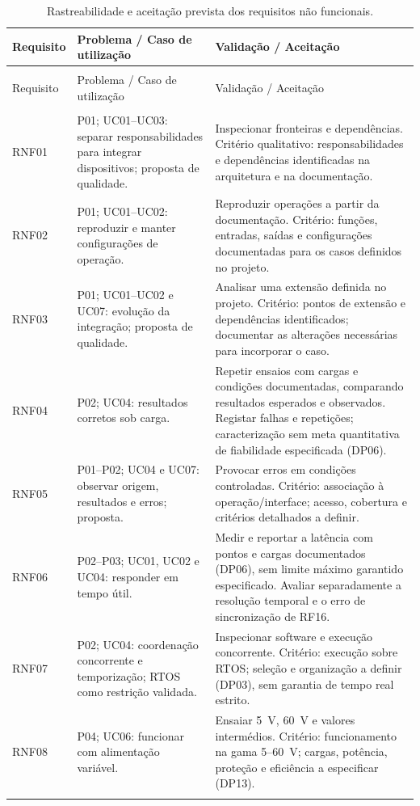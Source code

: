 \begingroup
\small
{}
\setlength{\tabcolsep}{4pt}
\renewcommand{\arraystretch}{1.12}
\begin{longtable}{@{}>{\raggedright\arraybackslash}p{}>{\raggedright\arraybackslash}p{}>{\raggedright\arraybackslash}p{}@{}}
\caption{Rastreabilidade e aceitação prevista dos requisitos não funcionais.}\label{tab:rastreabilidade-rnf}\\
\toprule
\rowcolor{LasetTint}
Requisito & Problema / Caso de utilização & Validação / Aceitação \\
\midrule
\endfirsthead
\multicolumn{3}{c}{\tablename~\thetable{} (continuação)}\\
\toprule
\rowcolor{LasetTint}
Requisito & Problema / Caso de utilização & Validação / Aceitação \\
\midrule
\endhead
\midrule
\multicolumn{3}{r}{Continua na página seguinte}\\
\endfoot
\bottomrule
\endlastfoot
RNF01 & P01; UC01--UC03: separar responsabilidades para integrar dispositivos; proposta de qualidade. & Inspecionar fronteiras e dependências. Critério qualitativo: responsabilidades e dependências identificadas na arquitetura e na documentação. \\
\addlinespace
RNF02 & P01; UC01--UC02: reproduzir e manter configurações de operação. & Reproduzir operações a partir da documentação. Critério: funções, entradas, saídas e configurações documentadas para os casos definidos no projeto. \\
\addlinespace
RNF03 & P01; UC01--UC02 e UC07: evolução da integração; proposta de qualidade. & Analisar uma extensão definida no projeto. Critério: pontos de extensão e dependências identificados; documentar as alterações necessárias para incorporar o caso. \\
\addlinespace
RNF04 & P02; UC04: resultados corretos sob carga. & Repetir ensaios com cargas e condições documentadas, comparando resultados esperados e observados. Registar falhas e repetições; caracterização sem meta quantitativa de fiabilidade especificada (DP06). \\
\addlinespace
RNF05 & P01--P02; UC04 e UC07: observar origem, resultados e erros; proposta. & Provocar erros em condições controladas. Critério: associação à operação/interface; acesso, cobertura e critérios detalhados a definir. \\
\addlinespace
RNF06 & P02--P03; UC01, UC02 e UC04: responder em tempo útil. & Medir e reportar a latência com pontos e cargas documentados (DP06), sem limite máximo garantido especificado. Avaliar separadamente a resolução temporal e o erro de sincronização de RF16. \\
\addlinespace
RNF07 & P02; UC04: coordenação concorrente e temporização; RTOS como restrição validada. & Inspecionar software e execução concorrente. Critério: execução sobre RTOS; seleção e organização a definir (DP03), sem garantia de tempo real estrito. \\
\addlinespace
RNF08 & P04; UC06: funcionar com alimentação variável. & Ensaiar 5~V, 60~V e valores intermédios. Critério: funcionamento na gama 5--60~V; cargas, potência, proteção e eficiência a especificar (DP13). \\
\addlinespace
\end{longtable}
